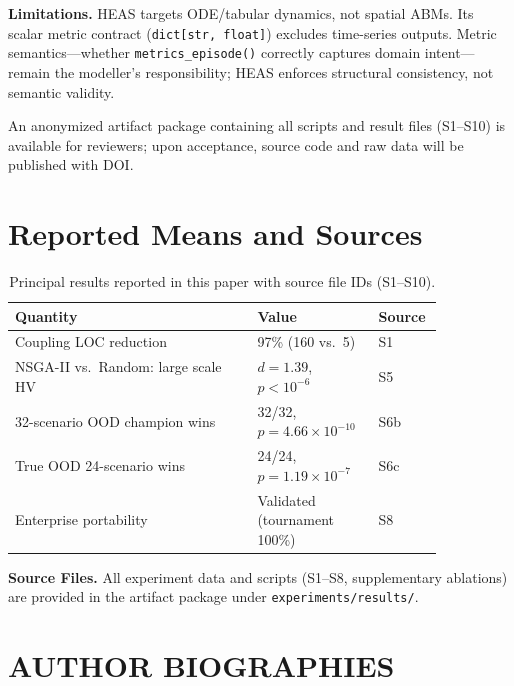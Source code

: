 \documentclass{wscpaperproc}
\begin{document}
\textbf{Limitations.} HEAS targets ODE/tabular dynamics, not spatial ABMs. Its
scalar metric contract (\texttt{dict[str, float]}) excludes time-series outputs.
Metric semantics---whether \texttt{metrics\_episode()} correctly captures domain
intent---remain the modeller's responsibility; HEAS enforces structural
consistency, not semantic validity.

An anonymized artifact package containing all scripts and result files (S1--S10)
is available for reviewers; upon acceptance, source code and raw data will be
published with DOI.

\appendix
\section{Reported Means and Sources}

\begin{table}[ht]
\caption{Principal results reported in this paper with source file IDs (S1--S10).}
\label{tab:appendix-results}
\centering\small
\begin{tabular}{p{0.52\linewidth}p{0.23\linewidth}p{0.1\linewidth}}
\toprule
Quantity & Value & Source \\
\midrule
Coupling LOC reduction & 97\% (160 vs.\ 5) & S1 \\
NSGA-II vs.\ Random: large scale HV & $d=1.39$, $p<10^{-6}$ & S5 \\
32-scenario OOD champion wins & 32/32, $p=4.66\!\times\!10^{-10}$ & S6b \\
True OOD 24-scenario wins & 24/24, $p=1.19\!\times\!10^{-7}$ & S6c \\
Enterprise portability & Validated (tournament 100\%) & S8 \\
\bottomrule
\end{tabular}
\end{table}

\noindent\textbf{Source Files.} All experiment data and scripts (S1--S8, supplementary ablations)
are provided in the artifact package under \texttt{experiments/results/}.

\begingroup
\small


\endgroup

\section*{AUTHOR BIOGRAPHIES}
\end{document}
